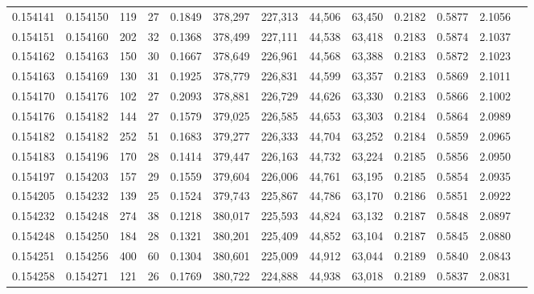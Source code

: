\begin{tabular}{rrrrrrrrrrrrr}
0.154141 & 0.154150 &   119 &  27 &                                     0.1849 & 378,297 & 227,313 &  44,506 &  63,450 & 0.2182 & 0.5877 & 2.1056 \\
0.154151 & 0.154160 &   202 &  32 &                                     0.1368 & 378,499 & 227,111 &  44,538 &  63,418 & 0.2183 & 0.5874 & 2.1037 \\
0.154162 & 0.154163 &   150 &  30 &                                     0.1667 & 378,649 & 226,961 &  44,568 &  63,388 & 0.2183 & 0.5872 & 2.1023 \\
0.154163 & 0.154169 &   130 &  31 &                                     0.1925 & 378,779 & 226,831 &  44,599 &  63,357 & 0.2183 & 0.5869 & 2.1011 \\
0.154170 & 0.154176 &   102 &  27 &                                     0.2093 & 378,881 & 226,729 &  44,626 &  63,330 & 0.2183 & 0.5866 & 2.1002 \\
0.154176 & 0.154182 &   144 &  27 &                                     0.1579 & 379,025 & 226,585 &  44,653 &  63,303 & 0.2184 & 0.5864 & 2.0989 \\
0.154182 & 0.154182 &   252 &  51 &                                     0.1683 & 379,277 & 226,333 &  44,704 &  63,252 & 0.2184 & 0.5859 & 2.0965 \\
0.154183 & 0.154196 &   170 &  28 &                                     0.1414 & 379,447 & 226,163 &  44,732 &  63,224 & 0.2185 & 0.5856 & 2.0950 \\
0.154197 & 0.154203 &   157 &  29 &                                     0.1559 & 379,604 & 226,006 &  44,761 &  63,195 & 0.2185 & 0.5854 & 2.0935 \\
0.154205 & 0.154232 &   139 &  25 &                                     0.1524 & 379,743 & 225,867 &  44,786 &  63,170 & 0.2186 & 0.5851 & 2.0922 \\
0.154232 & 0.154248 &   274 &  38 &                                     0.1218 & 380,017 & 225,593 &  44,824 &  63,132 & 0.2187 & 0.5848 & 2.0897 \\
0.154248 & 0.154250 &   184 &  28 &                                     0.1321 & 380,201 & 225,409 &  44,852 &  63,104 & 0.2187 & 0.5845 & 2.0880 \\
0.154251 & 0.154256 &   400 &  60 &                                     0.1304 & 380,601 & 225,009 &  44,912 &  63,044 & 0.2189 & 0.5840 & 2.0843 \\
0.154258 & 0.154271 &   121 &  26 &                                     0.1769 & 380,722 & 224,888 &  44,938 &  63,018 & 0.2189 & 0.5837 & 2.0831 \\

\end{tabular}
